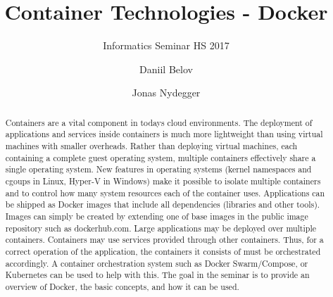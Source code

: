 \documentclass[sigconf]{acmart}
\begin{document}
\title{Container Technologies - Docker}
\subtitle{Informatics Seminar HS 2017}

\author{Daniil Belov}

\author{Jonas Nydegger}

\begin{abstract}
	Containers are a vital component in todays cloud environments. 
	The deployment of applications and services inside containers is much more lightweight than using virtual machines with smaller overheads.
	Rather than deploying virtual machines, each containing a complete guest operating system, multiple containers effectively share a single operating system. 
	New features in operating systems (kernel namespaces and cgoups in Linux, Hyper-V in Windows)
	make it possible to isolate multiple containers and to control how many system resources each of the container uses.
	Applications can be shipped as Docker images that include all dependencies (libraries and other tools). 
	Images can simply be created by extending one of base images in the public image repository such as dockerhub.com.
	Large applications may be deployed over multiple containers. Containers may use services provided through other containers. 
	Thus, for a correct operation of the application, the containers it consists of must be orchestrated accordingly. 
	A container orchestration system such as Docker Swarm/Compose, or Kubernetes can be used to help with this.
	The goal in the seminar is to provide an overview of Docker, the basic concepts, and how it can be used.
\end{abstract}
\end{document}
